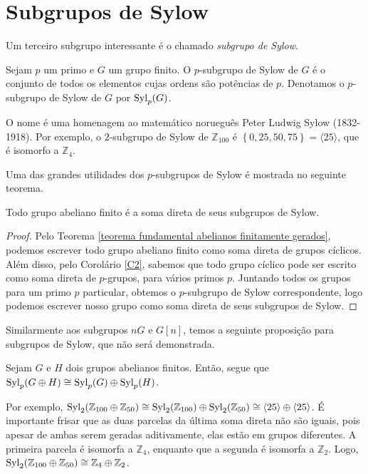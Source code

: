 	\section{Subgrupos de Sylow} Um terceiro subgrupo interessante é o chamado \textit{subgrupo de Sylow}.
	\begin{definition}
		\label{def subgrupo de Sylow}
		Sejam $p$ um primo e $G$ um grupo finito. O $p$-subgrupo de Sylow de $G$ é o conjunto de todos os elementos cujas ordens são potências de $p$. Denotamos o $p$-subgrupo de Sylow de $G$ por $\operatorname{Syl}_p(G)$.
	\end{definition}
	\par\vspace{0.3cm} O nome é uma homenagem ao matemático norueguês Peter Ludwig Sylow (1832-1918). Por exemplo, o $2$-subgrupo de Sylow de $\mathbb{Z}_{100}$	é $\left\{ 0, 25, 50, 75 \right\} = \langle 25 \rangle$, que é isomorfo a $\mathbb{Z}_4$.
	\par\vspace{0.3cm} Uma das grandes utilidades dos $p$-subgrupos de Sylow é mostrada no seguinte teorema.
	\begin{theorem}
		\label{subgrupos de Sylow e abelianos}
		Todo grupo abeliano finito é a soma direta de seus subgrupos de Sylow.
	\end{theorem}
	\begin{proof}
		Pelo Teorema \eqref{teorema fundamental abelianos finitamente gerados}, podemos escrever todo grupo abeliano finito como soma direta de grupos cíclicos. Além disso, pelo Corolário \eqref{C2}, sabemos que todo grupo cíclico pode ser escrito como soma direta de $p$-grupos, para vários primos $p$. Juntando todos os grupos para um primo $p$ particular, obtemos o $p$-subgrupo de Sylow correspondente, logo podemos escrever nosso grupo como soma direta de seus subgrupos de Sylow.
	\end{proof}
	\par\vspace{0.3cm} Similarmente aos subgrupos $nG$ e $G[n]$, temos a seguinte proposição para subgrupos de Sylow, que não será demonstrada.
	\begin{prop}
		\label{Sylow da soma direta}
		Sejam $G$ e $H$ dois grupos abelianos finitos. Então, segue que  $\operatorname{Syl}_p(G\oplus H)\cong \operatorname{Syl}_p(G)\oplus\operatorname{Syl}_p(H)$.
	\end{prop}
	\par\vspace{0.3cm} Por exemplo, $\operatorname{Syl}_2(\mathbb{Z}_{100}\oplus\mathbb{Z}_{50}) \cong \operatorname{Syl}_2(\mathbb{Z}_{100})\oplus\operatorname{Syl}_2(\mathbb{Z}_{50})\cong \langle 25 \rangle \oplus \langle 25 \rangle$. É importante frisar que as duas parcelas da última soma direta não são iguais, pois apesar de ambas serem geradas aditivamente, elas estão em grupos diferentes. A primeira parcela é isomorfa a $\mathbb{Z}_4$, enquanto que a segunda é isomorfa a $\mathbb{Z}_2$. Logo, $\operatorname{Syl}_2(\mathbb{Z}_{100}\oplus\mathbb{Z}_{50})\cong\mathbb{Z}_4\oplus\mathbb{Z}_2$.
